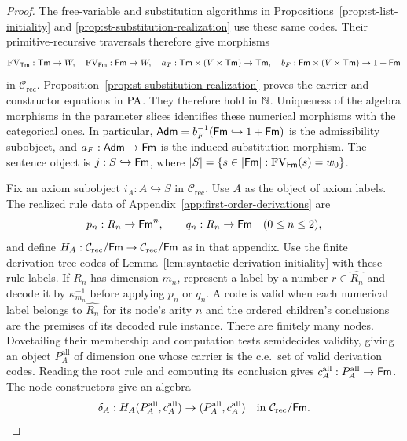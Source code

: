 \begin{proof}
The free-variable and substitution algorithms in
Propositions~\ref{prop:st-list-initiality} and
\ref{prop:st-substitution-realization} use these same codes.
Their primitive-recursive traversals therefore give morphisms
\[
 \operatorname{FV}_{\mathsf{Tm}}:\mathsf{Tm}\to W,\quad \operatorname{FV}_{\mathsf{Fm}}:\mathsf{Fm}\to W,\quad
 a_T:\mathsf{Tm}\times(V\times\mathsf{Tm})\to\mathsf{Tm},\quad
 b_F:\mathsf{Fm}\times(V\times\mathsf{Tm})\to1+\mathsf{Fm}
\]
in $\mathcal C_{\mathrm{rec}}$.
Proposition~\ref{prop:st-substitution-realization}
proves the carrier and constructor equations in $\mathrm{PA}$.
They therefore hold in $\mathbb N$. Uniqueness of the algebra morphisms in the parameter slices
identifies these numerical morphisms with the categorical ones.
In particular,
$\mathsf{Adm}=b_F^{-1}(\mathsf{Fm}\hookrightarrow1+\mathsf{Fm})$ is the admissibility
subobject, and $a_F:\mathsf{Adm}\to\mathsf{Fm}$ is the induced substitution
morphism. The sentence object is
$j:S\hookrightarrow\mathsf{Fm}$, where
$|S|=\{s\in|\mathsf{Fm}|:\operatorname{FV}_{\mathsf{Fm}}(s)=w_0\}$.

Fix an axiom subobject $i_A:A\hookrightarrow S$ in
$\mathcal C_{\mathrm{rec}}$. Use $A$ as the object of axiom labels. The realized
rule data of Appendix~\ref{app:first-order-derivations} are
\[
 p_n:R_n\to\mathsf{Fm}^n,\qquad q_n:R_n\to\mathsf{Fm}\quad(0\le n\le2),
\]
and define
$H_A:\mathcal C_{\mathrm{rec}}/\mathsf{Fm}\to
\mathcal C_{\mathrm{rec}}/\mathsf{Fm}$ as in that appendix.
Use the finite derivation-tree codes of
Lemma~\ref{lem:syntactic-derivation-initiality} with these rule labels.
If $R_n$ has dimension $m_n$, represent a label by a number
$r\in\widehat{R_n}$ and decode it by $\kappa_{m_n}^{-1}$
before applying $p_n$ or $q_n$. A code is valid when each numerical
label belongs to $\widehat{R_n}$ for its node's arity $n$ and the
ordered children's conclusions are the premises of its decoded rule instance.
There are finitely many nodes. Dovetailing their membership and
computation tests semidecides validity, giving an object
$P_A^{\mathrm{all}}$ of dimension one whose carrier is the
c.e.\ set of valid derivation codes. Reading the root rule and computing its conclusion
gives $c_A^{\mathrm{all}}:P_A^{\mathrm{all}}\to\mathsf{Fm}$.
The node constructors give an algebra
\[
 \delta_A:H_A(P_A^{\mathrm{all}},c_A^{\mathrm{all}})
           \to(P_A^{\mathrm{all}},c_A^{\mathrm{all}})
 \quad\text{in }\mathcal C_{\mathrm{rec}}/\mathsf{Fm}.
\]


\end{proof}
